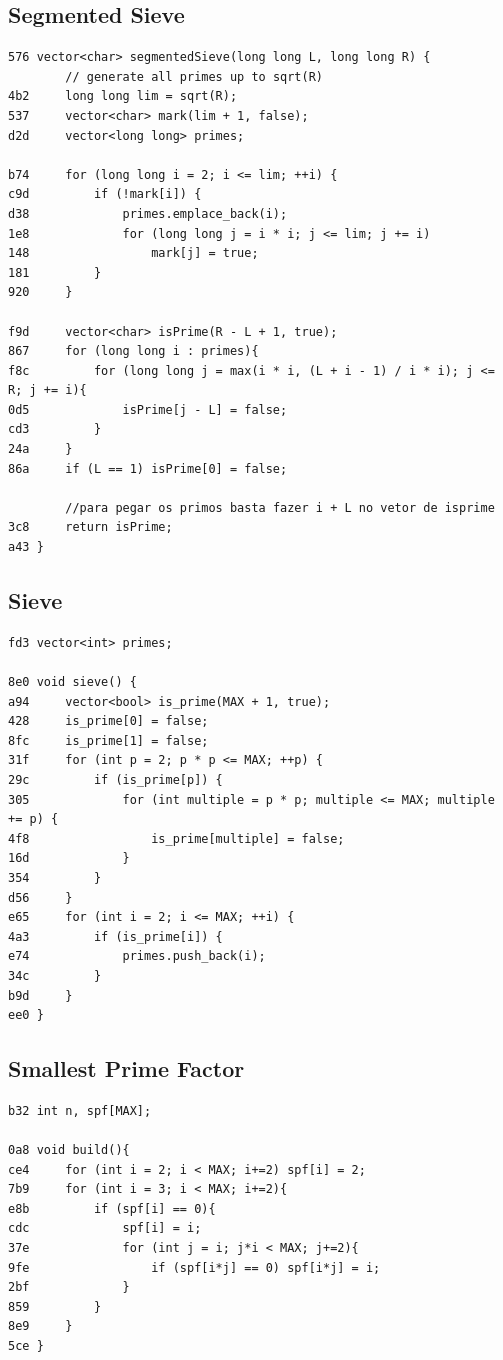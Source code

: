 \documentclass[11pt, a4paper, twoside]{article}
\begin{document}
{{\subsection{Segmented Sieve}
\begin{lstlisting}
576 vector<char> segmentedSieve(long long L, long long R) {
        // generate all primes up to sqrt(R)
4b2     long long lim = sqrt(R);
537     vector<char> mark(lim + 1, false);
d2d     vector<long long> primes;
    
b74     for (long long i = 2; i <= lim; ++i) {
c9d         if (!mark[i]) {
d38             primes.emplace_back(i);
1e8             for (long long j = i * i; j <= lim; j += i)
148                 mark[j] = true;
181         }
920     }
    
f9d     vector<char> isPrime(R - L + 1, true);
867     for (long long i : primes){
f8c         for (long long j = max(i * i, (L + i - 1) / i * i); j <= R; j += i){       
0d5             isPrime[j - L] = false;
cd3         }
24a     }
86a     if (L == 1) isPrime[0] = false;
        
        //para pegar os primos basta fazer i + L no vetor de isprime 
3c8     return isPrime;
a43 }
\end{lstlisting}

\subsection{Sieve}
\begin{lstlisting}
fd3 vector<int> primes;

8e0 void sieve() {
a94     vector<bool> is_prime(MAX + 1, true);
428     is_prime[0] = false;
8fc     is_prime[1] = false;
31f     for (int p = 2; p * p <= MAX; ++p) {
29c         if (is_prime[p]) {
305             for (int multiple = p * p; multiple <= MAX; multiple += p) {
4f8                 is_prime[multiple] = false;
16d             }
354         }
d56     }
e65     for (int i = 2; i <= MAX; ++i) {
4a3         if (is_prime[i]) {
e74             primes.push_back(i);
34c         }
b9d     }
ee0 }
\end{lstlisting}

\subsection{Smallest Prime Factor}
\begin{lstlisting}
b32 int n, spf[MAX];

0a8 void build(){
ce4     for (int i = 2; i < MAX; i+=2) spf[i] = 2;
7b9     for (int i = 3; i < MAX; i+=2){
e8b         if (spf[i] == 0){
cdc             spf[i] = i;
37e             for (int j = i; j*i < MAX; j+=2){
9fe                 if (spf[i*j] == 0) spf[i*j] = i;
2bf             }
859         }
8e9     }
5ce }


\end{lstlisting}}}
\end{document}
